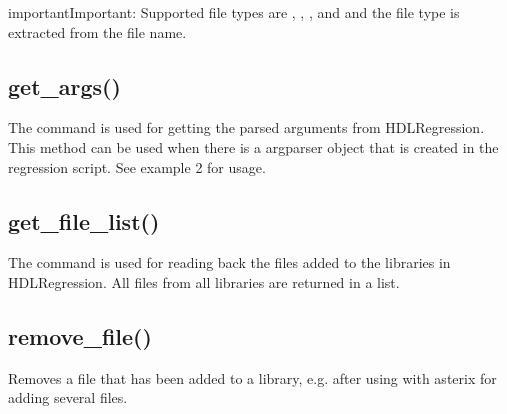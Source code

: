 \documentclass[letterpaper,10pt,english]{sphinxmanual}
\begin{document}
\begin{sphinxadmonition}{important}{Important:}
\sphinxAtStartPar
Supported file types are , , ,  and  and the file type is extracted from the file name.
\end{sphinxadmonition}


\subsection{get\_args()}
\label{\detokenize{api:get-args}}
\sphinxAtStartPar
The command is used for getting the parsed arguments from HDLRegression.
This method can be used when there is a argparser object that is created in the regression script.
See {\hyperref[\detokenize{api:hdlregression}]{}} example 2 for usage.

\sphinxAtStartPar
{}

\begin{sphinxVerbatim}[commandchars=\\\{\}]
  
\end{sphinxVerbatim}


\subsection{get\_file\_list()}
\label{\detokenize{api:get-file-list}}
\sphinxAtStartPar
The command is used for reading back the files added to the libraries in HDLRegression.
All files from all libraries are returned in a list.

\sphinxAtStartPar
{}

\begin{sphinxVerbatim}[commandchars=\\\{\}]
  
\end{sphinxVerbatim}


\subsection{remove\_file()}
\label{\detokenize{api:remove-file}}
\sphinxAtStartPar
Removes a file that has been added to a library, e.g. after using  with asterix for adding several files.
\end{document}
